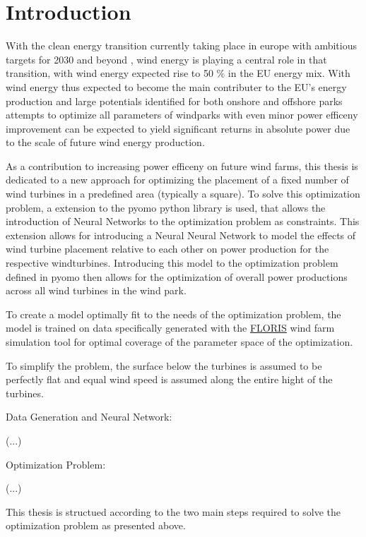 
\chapter{Introduction}\label{chapter:introduction}


With the clean energy transition currently taking place in europe with ambitious targets for 2030 and beyond \cite{EU_RE_Targets_2023} , wind energy is playing a central role in that transition, with wind energy expected rise to 50 \% in the EU energy mix. \cite{ConsiliumEU_Harnessing_Wind_Power_2024}
With wind energy thus expected to become the main contributer to the EU's energy production and large potentials identified for both onshore and offshore parks \cite{EEA_Wind_Energy_Potential_2009} attempts to optimize all parameters of windparks with even minor power efficeny improvement can be expected to yield significant returns in absolute power due to the scale of future wind energy production. 

As a contribution to increasing power efficeny on future wind farms, this thesis is dedicated to a new approach for optimizing the placement of a fixed number of wind turbines in a predefined area (typically a square). To solve this optimization problem, a extension to the pyomo python library is used, that allows the introduction of Neural Networks to the optimization problem as constraints. \cite{ALCANTARA2023120895} This extension allows for introducing a Neural Neural Network to model the effects of wind turbine placement relative to each other on power production for the respective windturbines. Introducing this model to the optimization problem defined in pyomo then allows for the optimization of overall power productions across all wind turbines in the wind park. 

To create a model optimally fit to the needs of the optimization problem, the model is trained on data specifically generated with the \href{https://www.nrel.gov/wind/floris.html}{FLORIS} wind farm simulation tool  for optimal coverage of the parameter space of the optimization. 

To simplify the problem, the surface below the turbines is assumed to be perfectly flat and equal wind speed is assumed along the entire hight of the turbines. 

Data Generation and Neural Network: 

(...)

Optimization Problem: 

(...)


This thesis is structued according to the two main steps required to solve the optimization problem as presented above.








